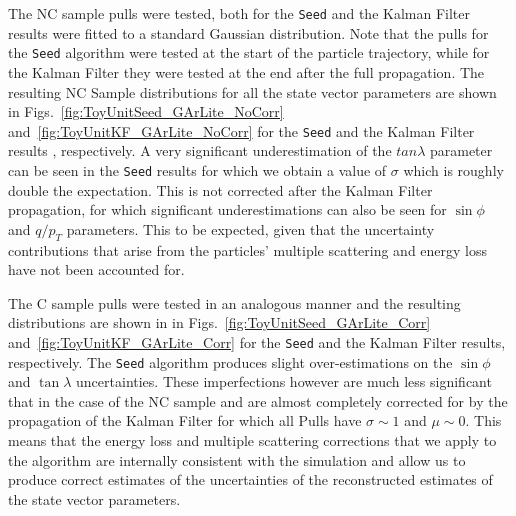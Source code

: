 The NC sample pulls were tested, both for the \texttt{Seed} and the Kalman Filter results were fitted to a standard Gaussian distribution. Note that the pulls for the \texttt{Seed} algorithm were tested at the start of the particle trajectory, while for the Kalman Filter they were tested at the end after the full propagation. The resulting NC Sample distributions for all the state vector parameters are shown in Figs.~\ref{fig:ToyUnitSeed_GArLite_NoCorr}  and~\ref{fig:ToyUnitKF_GArLite_NoCorr} for the \texttt{Seed} and the Kalman Filter results , respectively. A very significant underestimation of the $tan\lambda$ parameter can be seen in the \texttt{Seed}  results for which we obtain a value of $\sigma$ which is roughly double the expectation. This is not corrected after the Kalman Filter propagation, for which significant underestimations can also be seen for $\sin\phi$ and $q/p_T$ parameters. This to be expected, given that the uncertainty contributions that arise from the particles' multiple scattering and energy loss have not been accounted for.

The C sample pulls were tested in an analogous manner and the resulting distributions are shown in in Figs.~\ref{fig:ToyUnitSeed_GArLite_Corr}  and~\ref{fig:ToyUnitKF_GArLite_Corr} for the \texttt{Seed} and the Kalman Filter results, respectively. The \texttt{Seed} algorithm produces slight over-estimations on the $\sin\phi$ and $\tan\lambda$ uncertainties. These imperfections however are much less significant that in the case of the NC sample and are almost completely corrected for by the propagation of the Kalman Filter for which all Pulls have $\sigma\sim 1$ and $\mu \sim 0$. This means that the energy loss and multiple scattering corrections that we apply to the algorithm are internally consistent with the simulation and allow us to produce correct estimates of the uncertainties of the reconstructed estimates of the state vector parameters.

